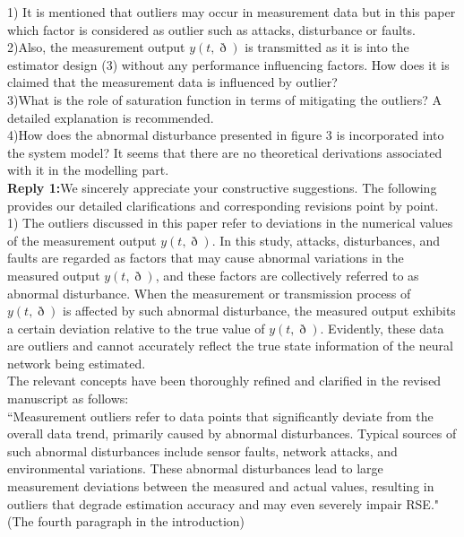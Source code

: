 \documentclass[14pt,fleqn]{article}
\begin{document}
1) It is mentioned that outliers may occur in measurement data but in this paper which factor is considered as outlier such as attacks, disturbance or faults.\\

2)Also, the measurement output $y(t,\eth)$ is transmitted as it is into the estimator design (3) without any performance influencing factors. How does it is claimed that the measurement data is influenced by outlier?\\

3)What is the role of saturation function in terms of mitigating the outliers? A detailed explanation is recommended.\\

4)How does the abnormal disturbance presented in figure 3 is incorporated into the system model? It seems that there are no theoretical derivations associated with it in the modelling part.
\\[10pt]
\indent \textbf{Reply 1:}We sincerely appreciate your constructive suggestions. The following provides our detailed clarifications and corresponding revisions point by point. \\


1) The outliers discussed in this paper refer to deviations in the numerical values of the measurement output $y(t,\eth)$. In this study, attacks, disturbances, and faults are regarded as factors that may cause abnormal variations in the measured output $y(t,\eth)$, and these factors are collectively referred to as abnormal disturbance. When the measurement or transmission process of $y(t,\eth)$ is affected by such abnormal disturbance, the measured output exhibits a certain deviation relative to the true value of $y(t,\eth)$. Evidently, these data are outliers and cannot accurately reflect the true state information of the neural network being estimated.\\

The relevant concepts have been thoroughly refined and clarified in the revised manuscript as follows:\\

``Measurement outliers refer to data points that significantly deviate from the overall data trend, {\color{red}primarily caused by abnormal disturbances. Typical sources of such abnormal disturbances include sensor faults, network attacks, and environmental variations. These abnormal disturbances lead to large measurement deviations between the measured and actual values, resulting in outliers that degrade estimation accuracy and may even severely impair RSE."}(The fourth paragraph in the introduction)\\
\end{document}
